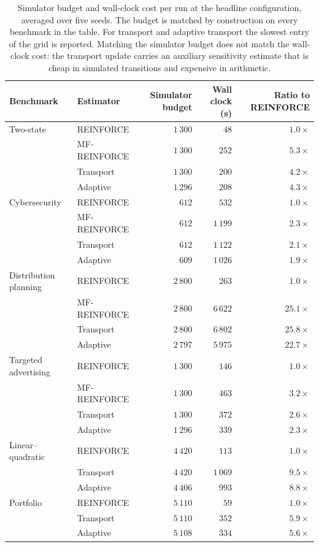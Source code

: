 \begin{table}[H]
\centering
\begin{tabular}{llrrr}
\toprule
Benchmark & Estimator & Simulator budget & Wall clock (s) & Ratio to REINFORCE \\
\midrule
Two-state & REINFORCE & $1\,300$ & $48$ & $1.0\times$ \\
 & MF-REINFORCE & $1\,300$ & $252$ & $5.3\times$ \\
 & Transport & $1\,300$ & $200$ & $4.2\times$ \\
 & Adaptive & $1\,296$ & $208$ & $4.3\times$ \\
\midrule
Cybersecurity & REINFORCE & $612$ & $532$ & $1.0\times$ \\
 & MF-REINFORCE & $612$ & $1\,199$ & $2.3\times$ \\
 & Transport & $612$ & $1\,122$ & $2.1\times$ \\
 & Adaptive & $609$ & $1\,026$ & $1.9\times$ \\
\midrule
Distribution planning & REINFORCE & $2\,800$ & $263$ & $1.0\times$ \\
 & MF-REINFORCE & $2\,800$ & $6\,622$ & $25.1\times$ \\
 & Transport & $2\,800$ & $6\,802$ & $25.8\times$ \\
 & Adaptive & $2\,797$ & $5\,975$ & $22.7\times$ \\
\midrule
Targeted advertising & REINFORCE & $1\,300$ & $146$ & $1.0\times$ \\
 & MF-REINFORCE & $1\,300$ & $463$ & $3.2\times$ \\
 & Transport & $1\,300$ & $372$ & $2.6\times$ \\
 & Adaptive & $1\,296$ & $339$ & $2.3\times$ \\
\midrule
Linear--quadratic & REINFORCE & $4\,420$ & $113$ & $1.0\times$ \\
 & Transport & $4\,420$ & $1\,069$ & $9.5\times$ \\
 & Adaptive & $4\,406$ & $993$ & $8.8\times$ \\
\midrule
Portfolio & REINFORCE & $5\,110$ & $59$ & $1.0\times$ \\
 & Transport & $5\,110$ & $352$ & $5.9\times$ \\
 & Adaptive & $5\,108$ & $334$ & $5.6\times$ \\
\bottomrule
\end{tabular}
\caption{Simulator budget and wall-clock cost per run at the headline configuration, averaged over five seeds. The budget is matched by construction on every benchmark in the table. For transport and adaptive transport the slowest entry of the grid is reported. Matching the simulator budget does not match the wall-clock cost: the transport update carries an auxiliary sensitivity estimate that is cheap in simulated transitions and expensive in arithmetic.}
\label{tab:budget-runtime}
\end{table}
